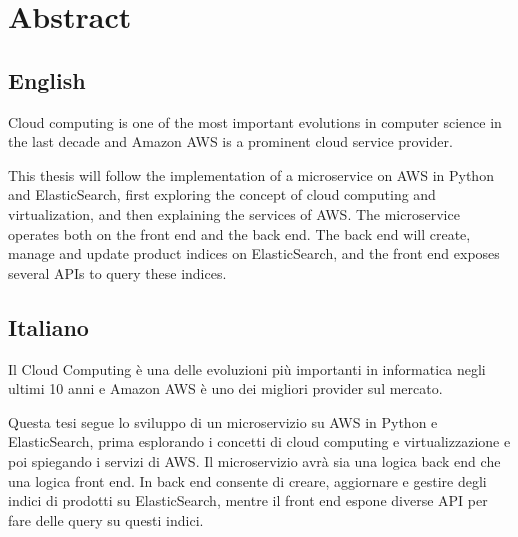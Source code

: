 \chapter{Abstract}
\label{ch:abstract}

\section*{English}
Cloud computing is one of the most important evolutions in computer science in the last decade and Amazon AWS is
a prominent cloud service provider.

This thesis will follow the implementation of a microservice on AWS in Python and ElasticSearch,
first exploring the concept of cloud computing and virtualization, and then explaining the services of AWS. 
The microservice operates both on the front end and the back end.
The back end will create, manage and update product indices on ElasticSearch, and the front end exposes
several APIs to query these indices.


\section*{Italiano}
Il Cloud Computing è una delle evoluzioni più importanti in informatica negli ultimi 10 anni e Amazon
AWS è uno dei migliori provider sul mercato.

Questa tesi segue lo sviluppo di un microservizio su AWS in Python e ElasticSearch,
prima esplorando i concetti di cloud computing e virtualizzazione e poi spiegando i servizi di AWS.
Il microservizio avrà sia una logica back end che una logica front end.
In back end consente di creare, aggiornare e gestire degli indici di prodotti su ElasticSearch,
mentre il front end espone diverse API per fare delle query su questi indici.

